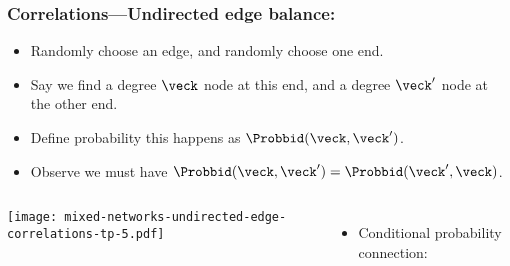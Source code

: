 \begin{frame}
  \frametitle{Correlations---Undirected edge balance:}

  \begin{itemize}
  \item<1-> 
    Randomly choose an edge, and randomly choose one end.
  \item<2-> 
    Say we find a degree $\veck$ node at this end,
    and a degree $\veck'$ node at the other end.
  \item<3-> 
    Define probability this happens as $\Probbid(\veck, \veck')$.
  \item<4-> 
    Observe we must have $\Probbid(\veck, \veck') = \Probbid(\veck', \veck)$.
  \end{itemize}

      \begin{columns}
        \texttt{[image: mixed-networks-undirected-edge-correlations-tp-5.pdf]}
        \begin{itemize}
        \item<5->
          Conditional probability connection:        
        \end{itemize}
      \end{columns}

\end{frame}


